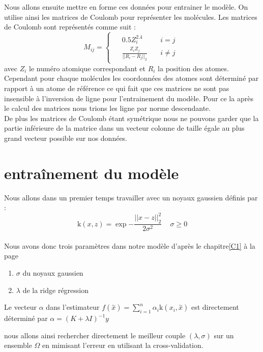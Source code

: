 \documentclass[a4paper,12pt,titlepage]{report}
\begin{document}
 \newpage
Nous allons ensuite mettre en forme ces données pour entrainer le modèle. On utilise ainsi les matrices de Coulomb pour représenter les molécules.
Les matrices de Coulomb sont représentés comme suit : 
\[
M_{ij} = 
	\left\{
	\begin{array}{ccc}		
	\begin{aligned}
		& 0.5 Z_{i}^{2.4} \quad &i=j\\
		& \frac{Z_i Z_j}{||R_i - R_j||_{2}} \quad &i\neq j
	\end{aligned}
\end{array}
	\right.
\]
avec $Z_i$ le numéro atomique correspondant et $R_i$ la position des atomes.\\
Cependant pour chaque molécules les coordonnées des atomes sont déterminé par rapport à un atome de référence ce qui fait que ces matrices ne sont pas insensible à l'inversion de ligne pour l'entrainement du modèle. Pour ce la après le calcul des matrices nous trions les ligne par norme descendante.\\
De plus les matrices de Coulomb étant symétrique nous ne pouvons garder que la partie inférieure de la matrice dans un vecteur colonne de taille égale au plus grand vecteur possible sur nos données.

\section{entraînement du modèle}

Nous allons dans un premier temps travailler avec un noyaux gaussien définis par :
\[ 
	\text{k}(x,z) = \exp{- \frac{||x-z||_{2}^2}{2\sigma^2}} \, \quad \sigma \geqslant 0 
\]
\\
Nous avons donc trois paramètres dans notre modèle d'après le chapitre\ref{C1} à la page \pageref{C1}
\begin{enumerate}
    \item $\sigma$ du noyaux gaussien
    \item $\lambda$ de la ridge régression
\end{enumerate}

Le vecteur $\alpha$ dans l'estimateur  $f(\overset{\sim}{x}) = \sum_{i = 1}^{n}{\alpha_i \text{k}(x_i , \overset{\sim}{x})}$ est directement déterminé
par $\alpha	=(K + \lambda I)^{-1}y$

nous allons ainsi rechercher directement le meilleur couple $(\lambda, \sigma)$ sur un ensemble $\Omega$ en mimisant l'erreur en utilisant la cross-validation. 
\end{document}

